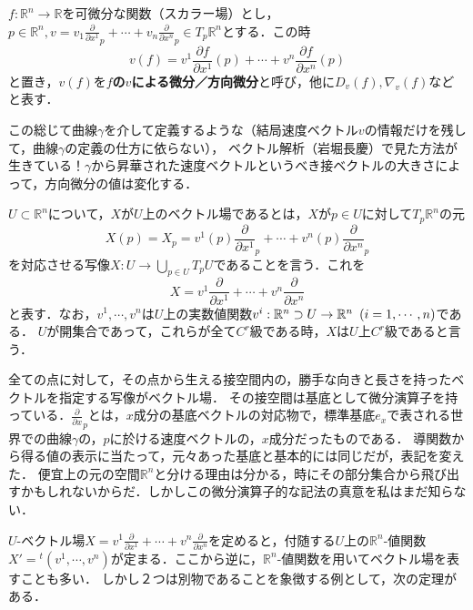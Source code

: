 \documentclass[uplatex, 12pt, dvipdfmx]{jsarticle}
\begin{document}
\begin{definition}[方向微分]
    $f:\mathbb{R}^n\to\mathbb{R}$を可微分な関数（スカラー場）とし，$p\in\mathbb{R}^n,v=v_1\frac{\partial}{\partial x^1}_p + \cdots + v_n\frac{\partial}{\partial x^n}_p\in T_p\mathbb{R}^n$とする．この時
    \[ v(f)=v^1 \frac{\partial f}{\partial x^1}(p)+\cdots +v^n\frac{\partial f}{\partial x^n}(p) \]
    と置き，$v(f)$を\textbf{$f$の$v$による微分／方向微分}と呼び，他に$D_v(f),\nabla_v(f)$などと表す．
\end{definition}

この総じて曲線$\gamma$を介して定義するような（結局速度ベクトル$v$の情報だけを残して，曲線$\gamma$の定義の仕方に依らない），
ベクトル解析（岩堀長慶）で見た方法が生きている！$\gamma$から昇華された速度ベクトルというべき接ベクトルの大きさによって，方向微分の値は変化する．

\begin{definition}[ベクトル場]
    $U\subset\mathbb{R}^n$について，$X$が$U$上のベクトル場であるとは，$X$が$p\in U$に対して$T_p\mathbb{R}^n$の元
    \[ X(p)=X_p=v^1(p)\frac{\partial}{\partial x^1}_p + \cdots + v^n(p)\frac{\partial}{\partial x^n}_p \]
    を対応させる写像$X:U\to \bigcup_{p\in U}T_pU$であることを言う．これを
    \[ X=v^1\frac{\partial}{\partial x^1}+\cdots +v^n\frac{\partial}{\partial x^n} \]
    と表す．なお，$v^1,\cdots,v^n$は$U$上の実数値関数$v^i:\mathbb{R}^n\supset U\to\mathbb{R}^n\hspace{0.5em}(i=1,\cdots,n)$である．
    $U$が開集合であって，これらが全て$C^r$級である時，$X$は$U$上$C^r$級であると言う．
\end{definition}
全ての点に対して，その点から生える接空間内の，勝手な向きと長さを持ったベクトルを指定する写像がベクトル場．
その接空間は基底として微分演算子を持っている．$\frac{\partial}{\partial x}_p$とは，$x$成分の基底ベクトルの対応物で，標準基底$e_x$で表される世界での曲線$\gamma$の，$p$に於ける速度ベクトルの，$x$成分だったものである．
導関数から得る値の表示に当たって，元々あった基底と基本的には同じだが，表記を変えた．
便宜上の元の空間$\mathbb{R}^n$と分ける理由は分かる，時にその部分集合から飛び出すかもしれないからだ．しかしこの微分演算子的な記法の真意を私はまだ知らない．

\begin{remark}
    $U$-ベクトル場$X=v^1\frac{\partial}{\partial x^1}+\cdots +v^n\frac{\partial}{\partial x^n}$を定めると，付随する$U$上の$\mathbb{R}^n$-値関数$X'={}^t\!(v^1,\cdots,v^n)$が定まる．ここから逆に，$\mathbb{R}^n$-値関数を用いてベクトル場を表すことも多い．
    しかし２つは別物であることを象徴する例として，次の定理がある．
\end{remark}
\end{document}

